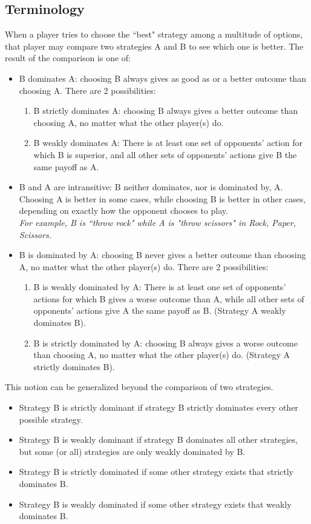 \documentclass[a4paper,12pt]{article}
\begin{document}
\subsection{Terminology}
When a player tries to choose the ``best" strategy among a multitude of options, that player may compare two strategies A and B to see which one is better. The result of the comparison is one of:
\begin{itemize}
	\item B dominates A: choosing B always gives as good as or a better outcome than choosing A. There are 2 possibilities:
	\begin{enumerate}
	\item B strictly dominates A: choosing B always gives a better outcome than choosing A, no matter what the other player(s) do.
	\item B weakly dominates A: There is at least one set of opponents' action for which B is superior, and all other sets of opponents' actions give B the same payoff as A.
	\end{enumerate}
	\item B and A are intransitive: B neither dominates, nor is dominated by, A. Choosing A is better in some cases, while choosing B is better in other cases, depending on exactly how the opponent chooses to play. \\ \textit{For example, B is ``throw rock" while A is "throw scissors" in Rock, Paper, Scissors.}
	\item B is dominated by A: choosing B never gives a better outcome than choosing A, no matter what the other player(s) do. There are 2 possibilities:
	\begin{enumerate}
	\item B is weakly dominated by A: There is at least one set of opponents' actions for which B gives a worse outcome than A, while all other sets of opponents' actions give A the same payoff as B. (Strategy A weakly dominates B).
	\item B is strictly dominated by A: choosing B always gives a worse outcome than choosing A, no matter what the other player(s) do. (Strategy A strictly dominates B).
	\end{enumerate}
\end{itemize}
\medskip
This notion can be generalized beyond the comparison of two strategies.

\begin{itemize}
	\item Strategy B is strictly dominant if strategy B strictly dominates every other possible strategy.
	\item Strategy B is weakly dominant if strategy B dominates all other strategies, but some (or all) strategies are only weakly dominated by B.
	\item Strategy B is strictly dominated if some other strategy exists that strictly dominates B.
	\item Strategy B is weakly dominated if some other strategy exists that weakly dominates B.
\end{itemize}
\newpage
\end{document}

